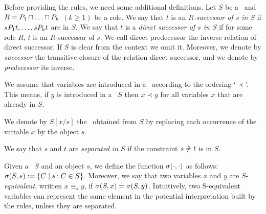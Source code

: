 Before providing the rules, we need some additional definitions.
Let $S$ be a \cs\ and $R= P_1\sqcap\ldots\sqcap P_k$ $(k \ge 1)$ be a role.
We say that $t$ is an {\em $R$-successor of $s$ in $S$\/}
if $sP_1t ,\ldots, sP_kt$ are in $S$.  We say that $t$ is a {\em direct successor of $s$ in $S$\/}
if for some role $R$, $t$ is an $R$-successor of $s$. We call direct predecessor
the inverse relation of direct successor. If $S$ is clear from the context we
omit it.
Moreover, we denote by {\em successor} the transitive closure of the relation
direct successor, and we denote by {\em predecessor} its inverse.


We assume that variables are introduced in a \cs\ according to the ordering
`$\prec$'. This means, if $y$ is introduced in a \cs\ $S$ then $x \prec y$ for
all variables $x$ that are already in $S$.

We denote by $S[x/s]$ the \cs\ obtained from $S$ by replacing
each occurrence of the variable $x$ by the object $s$. 

We say that $s$ and $t$ are {\em separated in $S$\/} if the constraint
${s \not\doteq t}$ is in $S$.

Given a \cs\ $S$ and an object $s$, we define the function $\sigma(\cdot,\cdot)$ as
follows: $\sigma(S,s) :=\{C \mid s\colon C \in S\}$. Moreover, we say that two variables 
$x$ and $y$ are $S$-{\em equivalent}, written $x \equiv_s y$, if 
$\sigma(S,x) =\sigma(S,y)$. Intuitively, two S-equivalent variables 
can represent the same element in the potential interpretation 
built by the rules, unless they are separated.

